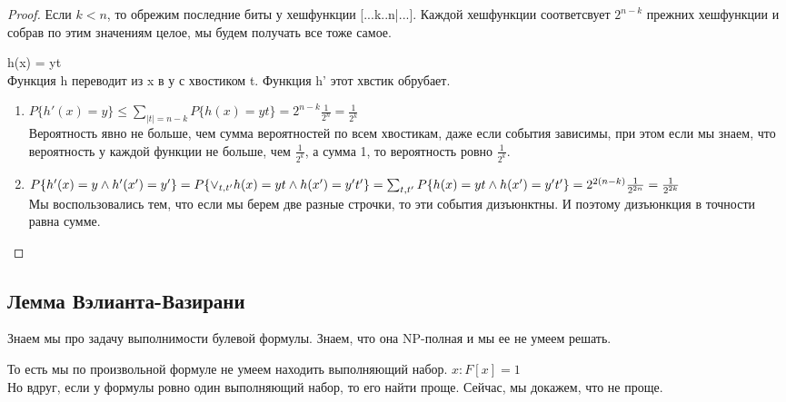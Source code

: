 \begin{proof}
	Если $k < n$, то обрежим последние биты у хешфункции [...k..n|...]. Каждой хешфункции соответсвует $2^{n - k}$
	прежних хешфункции и собрав по этим значениям целое, мы будем получать все тоже самое. 


	h(x) = yt\\
	Функция h переводит из x в у с хвостиком t. Функция h' этот хвстик обрубает.  

	\begin{enumerate}
	\item 
		$P\{h'(x) = y\} \le \sum_{|t| = n - k} P\{h(x) = yt\} = 2^{n - k}\frac{1}{2^n} = \frac{1}{2^k}$\\
		Вероятность явно не больше, чем сумма вероятностей по всем хвостикам, даже если события зависимы, 
		при этом если мы знаем, что вероятность у каждой функции не больше, чем $\frac{1}{2^k}$, а сумма 1, 
		то вероятность ровно $\frac{1}{2^k}$.
	\item	
		$P \{h'(x) = y \wedge h'(x') = y'\} = P\{\vee_{t, t'} h(x) = yt \wedge h(x') = y't' \}\\
		= \sum_{t, t'} P\{h(x) = yt \wedge h(x') = y't' \} = 2^{2(n - k)}\frac{1}{2^{2n}} = \frac{1}{2^{2k}}$\\

		Мы воспользовались тем, что если мы берем две разные строчки, то эти события дизъюнктны. И поэтому 
		дизъюнкция в точности равна сумме. 
	\end{enumerate}
\end{proof}

\subsection{Лемма Вэлианта-Вазирани}

Знаем мы про задачу выполнимости булевой формулы. Знаем, что она NP-полная и мы 
ее не умеем решать. 

То есть мы по произвольной формуле не умеем находить выполняющий набор. 
$x \colon F[x] = 1$\\

Но вдруг, если у формулы ровно один выполняющий набор, то его 
найти проще. Сейчас, мы докажем, что не проще. 

